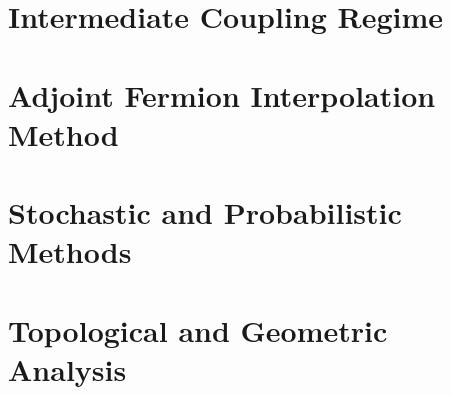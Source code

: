 \documentclass[11pt,a4paper]{report}
\begin{document}
\chapter{Intermediate Coupling Regime}
\label{ch:intermediate}





\chapter{Adjoint Fermion Interpolation Method}
\label{ch:adjoint}





\chapter{Stochastic and Probabilistic Methods}
\label{ch:stochastic}





\chapter{Topological and Geometric Analysis}
\label{ch:topological}





\end{document}
